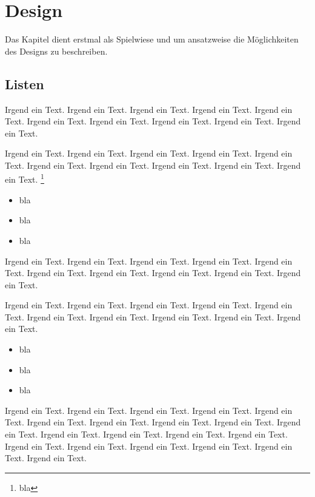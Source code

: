 \chapter{Design}

Das Kapitel dient erstmal als Spielwiese und um ansatzweise die Möglichkeiten des Designs zu beschreiben.

\section{Listen}

Irgend ein Text. Irgend ein Text. Irgend ein Text. Irgend ein Text. Irgend ein Text. Irgend ein Text. Irgend ein Text. Irgend ein Text. Irgend ein Text. Irgend ein Text.

Irgend ein Text. Irgend ein Text. Irgend ein Text. Irgend ein Text. Irgend ein Text. Irgend ein Text. Irgend ein Text. Irgend ein Text. Irgend ein Text. Irgend ein Text. \footnote{bla}
\begin{itemize}
	\item bla
	\item bla
	\item bla
\end{itemize}
Irgend ein Text. Irgend ein Text. Irgend ein Text. Irgend ein Text. Irgend ein Text. Irgend ein Text. Irgend ein Text. Irgend ein Text. Irgend ein Text. Irgend ein Text.

Irgend ein Text. Irgend ein Text. Irgend ein Text. Irgend ein Text. Irgend ein Text. Irgend ein Text. Irgend ein Text. Irgend ein Text. Irgend ein Text. Irgend ein Text. 

\begin{itemize}
	\item bla
	\item bla
	\item bla
\end{itemize}

Irgend ein Text. Irgend ein Text. Irgend ein Text. Irgend ein Text. Irgend ein Text. Irgend ein Text. Irgend ein Text. Irgend ein Text. Irgend ein Text. Irgend ein Text. Irgend ein Text. Irgend ein Text. Irgend ein Text. Irgend ein Text. Irgend ein Text. Irgend ein Text. Irgend ein Text. Irgend ein Text. Irgend ein Text. Irgend ein Text. 

